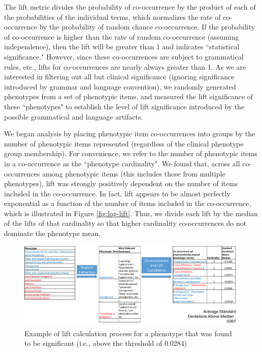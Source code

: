 \documentclass{sig-alternate-05-2015}
\begin{document}
The lift metric divides the probability of co-occurrence by the product of each of the probabilities of the individual terms, which normalizes the rate of co-occurrence by the probability of random chance co-occurrence.
If the probability of co-occurrence is higher than the rate of random co-occurrence (assuming independence), then the lift will be greater than 1 and indicates ``statistical significance."
However, since these co-occurrences are subject to grammatical rules, etc., lifts for co-occurrences are nearly always greater than 1.
As we are interested in filtering out all but clinical significance (ignoring significance introduced by grammar and language convention), we randomly generated phenotypes from a set of phenotypic items, and measured the lift significance of these ``phenotypes" to establish the level of lift significance introduced by the possible grammatical and language artifacts.

We began analysis by placing phenotypic item co-occurrences into groups by the number of phenotypic items represented (regardless of the clinical phenotype group membership). 
For convenience, we refer to the number of phenotypic items in a co-occurrence as the ``phenotype cardinality". 
We found that, across all co-occurrences among phenotypic items (this includes those from multiple phenotypes), lift was strongly positively dependent on the number of items included in the co-occurrence.
In fact, lift appears to be almost perfectly exponential as a function of the number of items included in the co-occurrence, which is illustrated in Figure \ref{fig:log-lift}. 
Thus, we divide each lift by the median of the lifts of that cardinality so that higher cardinality co-occurrences do not dominate the phenotype mean. 

\begin{figure} [t]
\centering
\includegraphics[width=\linewidth]{lift-process-cartoon.png}
\caption{Example of lift calculation process for a phenotype that was found to be significant (i.e., above the threshold of 0.0284)}
\label{fig:lift-process-cartoon}
\end{figure}
\end{document}
